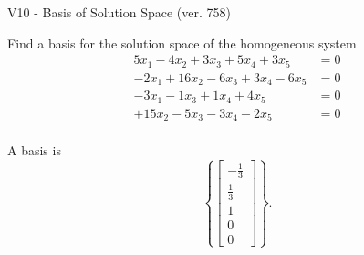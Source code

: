 \begin{exercise}
  \begin{exerciseTitle}V10 - Basis of Solution Space (ver. 758)\end{exerciseTitle}
  \begin{exerciseStatement}
    Find a basis for the solution space of the homogeneous system 
\begin{align*}
 5 x_ 1 -4 x_ 2 + 3 x_ 3 + 5 x_ 4 + 3 x_ 5 &= 0  \\ 
  -2 x_ 1 + 16 x_ 2 -6 x_ 3 + 3 x_ 4 -6 x_ 5 &= 0  \\ 
  -3 x_ 1 -1 x_ 3 + 1 x_ 4 + 4 x_ 5 &= 0  \\ 
  + 15 x_ 2 -5 x_ 3 -3 x_ 4 -2 x_ 5 &= 0  \\ 
 \end{align*}


 
  \end{exerciseStatement}

  \begin{exerciseAnswer}
   A basis is   
\[\left\{\left[\begin{array}{c}
-\frac{1}{3} \\
\frac{1}{3} \\
1 \\
0 \\
0
\end{array}\right]\right\}.\]

  


  \end{exerciseAnswer}
\end{exercise}